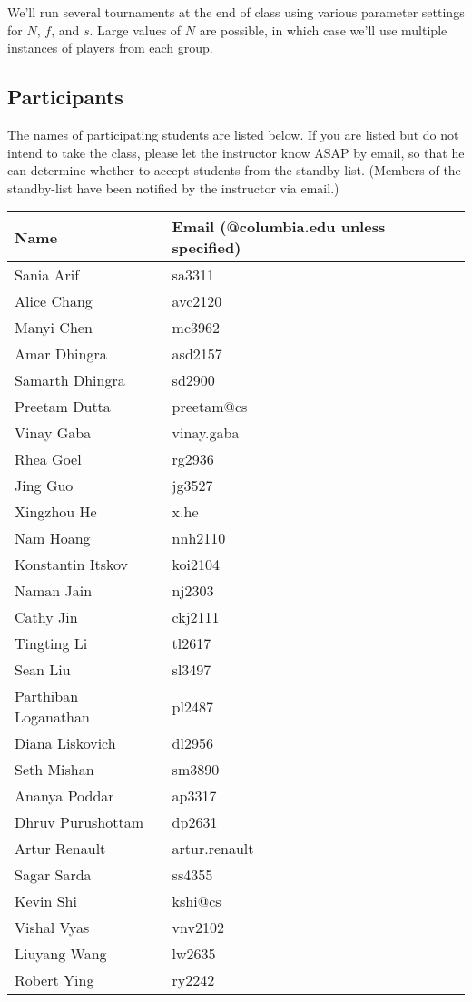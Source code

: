 We'll run several tournaments at the end of class using various
parameter settings for $N$, $f$, and $s$. Large values of $N$ are
possible, in which case we'll use multiple instances of players from
each group.

\subsection{Participants}

The names of participating students are listed below.  If you are listed but do not intend to
take the class, please let the instructor know ASAP by email, so that
he can determine whether to accept students from the standby-list.
(Members of the standby-list have been notified by the instructor via email.)

\begin{tabular}{ll}
Name & Email (@columbia.edu unless specified) \\ \hline
Sania Arif & sa3311 \\
Alice Chang & avc2120 \\
Manyi Chen & mc3962 \\
Amar Dhingra & asd2157 \\
Samarth Dhingra & sd2900 \\
Preetam Dutta & preetam@cs \\
Vinay Gaba & vinay.gaba \\
Rhea Goel & rg2936 \\
Jing Guo & jg3527 \\
Xingzhou He & x.he \\
Nam Hoang & nnh2110 \\
Konstantin Itskov & koi2104 \\
Naman Jain & nj2303 \\
Cathy Jin & ckj2111 \\
Tingting Li & tl2617 \\
Sean Liu & sl3497 \\
Parthiban Loganathan & pl2487 \\
Diana Liskovich & dl2956 \\
Seth Mishan & sm3890 \\
Ananya Poddar & ap3317 \\
Dhruv Purushottam & dp2631 \\
Artur Renault & artur.renault \\
Sagar Sarda & ss4355 \\
Kevin Shi & kshi@cs \\
Vishal Vyas & vnv2102 \\
Liuyang Wang & lw2635 \\
Robert Ying & ry2242 \\
\end{tabular}

